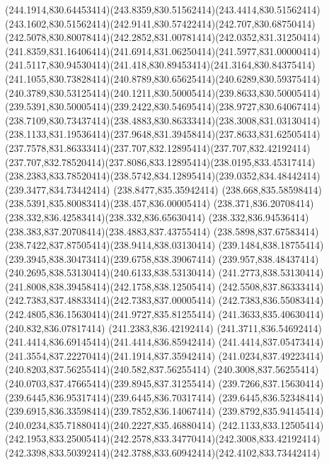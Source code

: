 {{	\curveto(244.1914,830.64453414)(243.8359,830.51562414)(243.4414,830.51562414)
	\curveto(243.1602,830.51562414)(242.9141,830.57422414)(242.707,830.68750414)
	\curveto(242.5078,830.80078414)(242.2852,831.00781414)(242.0352,831.31250414)
	\curveto(241.8359,831.16406414)(241.6914,831.06250414)(241.5977,831.00000414)
	\curveto(241.5117,830.94530414)(241.418,830.89453414)(241.3164,830.84375414)
	\curveto(241.1055,830.73828414)(240.8789,830.65625414)(240.6289,830.59375414)
	\curveto(240.3789,830.53125414)(240.1211,830.50005414)(239.8633,830.50005414)
	\curveto(239.5391,830.50005414)(239.2422,830.54695414)(238.9727,830.64067414)
	\curveto(238.7109,830.73437414)(238.4883,830.86333414)(238.3008,831.03130414)
	\curveto(238.1133,831.19536414)(237.9648,831.39458414)(237.8633,831.62505414)
	\curveto(237.7578,831.86333414)(237.707,832.12895414)(237.707,832.42192414)
	\curveto(237.707,832.78520414)(237.8086,833.12895414)(238.0195,833.45317414)
	\curveto(238.2383,833.78520414)(238.5742,834.12895414)(239.0352,834.48442414)
	\lineto(239.3477,834.73442414)
	\lineto(238.8477,835.35942414)
	\curveto(238.668,835.58598414)(238.5391,835.80083414)(238.457,836.00005414)
	\curveto(238.371,836.20708414)(238.332,836.42583414)(238.332,836.65630414)
	\curveto(238.332,836.94536414)(238.383,837.20708414)(238.4883,837.43755414)
	\curveto(238.5898,837.67583414)(238.7422,837.87505414)(238.9414,838.03130414)
	\curveto(239.1484,838.18755414)(239.3945,838.30473414)(239.6758,838.39067414)
	\curveto(239.957,838.48437414)(240.2695,838.53130414)(240.6133,838.53130414)
	\curveto(241.2773,838.53130414)(241.8008,838.39458414)(242.1758,838.12505414)
	\curveto(242.5508,837.86333414)(242.7383,837.48833414)(242.7383,837.00005414)
	\curveto(242.7383,836.55083414)(242.4805,836.15630414)(241.9727,835.81255414)
	\lineto(241.3633,835.40630414)
	\lineto(240.832,836.07817414)
	\lineto(241.2383,836.42192414)
	\curveto(241.3711,836.54692414)(241.4414,836.69145414)(241.4414,836.85942414)
	\curveto(241.4414,837.05473414)(241.3554,837.22270414)(241.1914,837.35942414)
	\curveto(241.0234,837.49223414)(240.8203,837.56255414)(240.582,837.56255414)
	\curveto(240.3008,837.56255414)(240.0703,837.47665414)(239.8945,837.31255414)
	\curveto(239.7266,837.15630414)(239.6445,836.95317414)(239.6445,836.70317414)
	\curveto(239.6445,836.52348414)(239.6915,836.33598414)(239.7852,836.14067414)
	\curveto(239.8792,835.94145414)(240.0234,835.71880414)(240.2227,835.46880414)
	\lineto(242.1133,833.12505414)
	\curveto(242.1953,833.25005414)(242.2578,833.34770414)(242.3008,833.42192414)
	\curveto(242.3398,833.50392414)(242.3788,833.60942414)(242.4102,833.73442414)
}}
